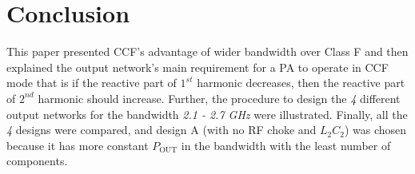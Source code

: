 \documentclass[conference]{IEEEtran}
\begin{document}
%






\section{Conclusion}
\label{section:Conclusion}
This paper presented CCF's advantage of wider bandwidth over Class F and then explained the output network's main requirement for a PA to operate in CCF mode that is if the reactive part of $1^{st}$ harmonic decreases, then the reactive part of $2^{nd}$ harmonic should increase. Further, the procedure to design the \textit{4} different output networks for the bandwidth \textit{2.1 - 2.7 GHz} were illustrated. Finally, all the \textit{4} designs were compared, and design A (with no RF choke and $L_2C_2$) was chosen because it has more constant $P_{\text{OUT}}$ in the bandwidth with the least number of components.
\end{document}
